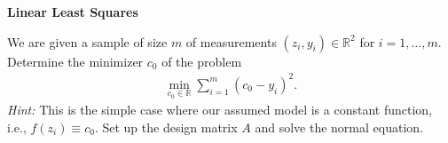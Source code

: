 \textbf{\normalsize Linear Least Squares}

We are given a sample of size $m$ of measurements $(z_i,y_i)\in\mathbb{R}^2$ for $i=1,\dots,m$. 
Determine the minimizer $c_0$ of the problem
\begin{align*}
\min \limits_{c_0\in\mathbb{R}} \sum_{i=1}^m (c_0 - y_i)^2.
\end{align*}
\textit{Hint: } This is the simple case where our assumed model is a constant function, i.e., $f(z_i) \equiv c_0$. Set up the design matrix $A$ and solve the normal equation.